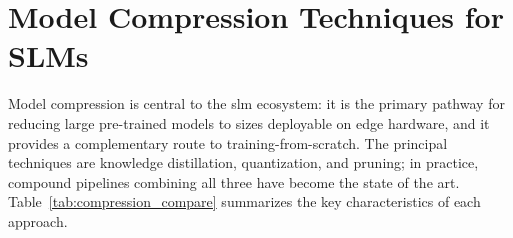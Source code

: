 
\section{Model Compression Techniques for SLMs}
\label{sec:compression}

Model compression is central to the \gls{slm} ecosystem: it is the primary pathway for reducing large pre-trained models to sizes deployable on edge hardware, and it provides a complementary route to training-from-scratch. The principal techniques are knowledge distillation, quantization, and pruning; in practice, compound pipelines combining all three have become the state of the art. Table~\ref{tab:compression_compare} summarizes the key characteristics of each approach.

\begin{table}[ht]
\small
\caption{Comparison of model compression techniques for SLMs. Compression ratios follow directly from the bit-width or sparsity level; the accuracy-retention column is an indicative band synthesized across the studies reviewed in this section, not a measurement of a single cohort, and is qualified in Appendix~\ref{subsec:appendix_provenance_status}.}
\label{tab:compression_compare}
\centering
\footnotesize{}
\end{table}

